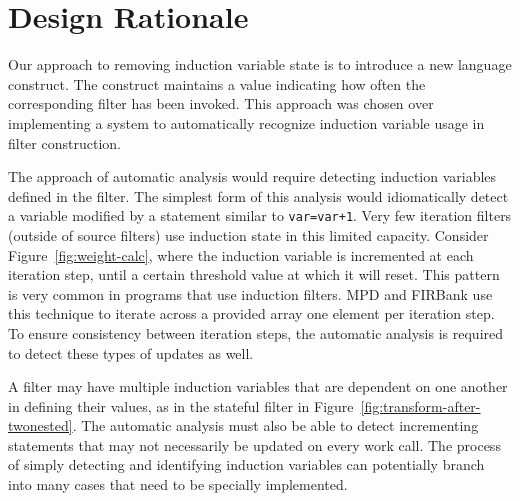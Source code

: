 \section{Design Rationale}
\label{sec:designrationale}

Our approach to removing induction variable state is to introduce a new language construct.  The construct maintains a value indicating how often the corresponding filter has been invoked.  This approach was chosen over implementing a system to automatically recognize induction variable usage in filter construction.

The approach of automatic analysis would require detecting induction variables defined in the filter.  The simplest form of this analysis would idiomatically detect a variable modified by a statement similar to \texttt{var=var+1}.  Very few iteration filters (outside of source filters) use induction state in this limited capacity.  Consider Figure~\ref{fig:weight-calc}, where the induction variable is incremented at each iteration step, until a certain threshold value at which it will reset.  This pattern is very common in programs that use induction filters.  MPD and FIRBank use this technique to iterate across a provided array one element per iteration step.  To ensure consistency between iteration steps, the automatic analysis is required to detect these types of updates as well.  

%
%
%
%

A filter may have multiple induction variables that are dependent on one another in defining their values, as in the stateful filter in Figure~\ref{fig:transform-after-twonested}.  The automatic analysis must also be able to detect incrementing statements that may not necessarily be updated on every work call.  The process of simply detecting and identifying induction variables can potentially branch into many cases that need to be specially implemented.

